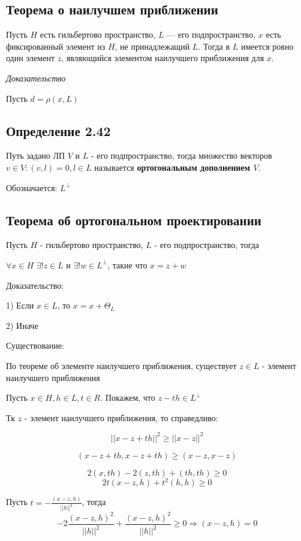 \documentclass[12pt]{article}
\begin{document}
\subsection*{Теорема о наилучшем приближении}
	
	Пусть $H$ есть гильбертово пространство, $L$ — его подпространство, $x$ есть фиксированный элемент из $H$, не принадлежащий $L$. Тогда в $L$ имеется ровно один элемент $z$, являющийся элементом
наилучшего приближения для $x$.
	
\textit{Доказательство}
	
		Пусть $d = \rho(x, L)$ 
	
	
	
\subsection*{Определение 2.42}
	Путь задано ЛП $V$ и $L$ - его подпространство, тогда множество векторов $v \in V : (v , l) = 0 , l \in L$ называется \textbf{ортогональным дополнением $V$}.
	
	Обозначается: $L^{\perp}$	
	
\subsection*{Теорема об ортогональном проектировании}	
	Пусть $H$ - гильбертово пространство, $L$ - его подпространство, тогда 
	
	$\forall x \in H$ $\exists ! z \in L$ и $\exists ! w \in L^{\perp}$, такие что 
	$x = z + w$
	
Доказательство:
	
	1) Если $x \in L$, то $x = x + \Theta_L$
	
	2) Иначе
	
	Существование:
	
	По теореме об элементе наилучшего приближения, существует $z \in L$ - элемент наилучшего приближения
	
	Пусть $x \in H, h \in L, t \in R$. Покажем, что $z - th \in L^{\perp}$
	
	Тк $z$ - элемент наилучшего приближения, то справедливо:
	
	$$||x - z + th||^2 \ge ||x-z||^2$$
	
	$$(x - z + th, x - z + th) \ge (x-z, x-z)$$
	
	$$2(x,th) - 2(z,th) + (th,th) \ge 0$$
	$$2t(x - z, h) + t^2(h,h) \ge 0$$
	
	Пусть $t = -\frac{(x - z,h)}{||h||^2}$, тогда 
	$$-2\frac{(x - z, h)^2}{||h||^2} + \frac{(x - z, h)^2}{||h||^2} \ge 0 \Rightarrow (x - z, h) = 0$$
	
\end{document}
